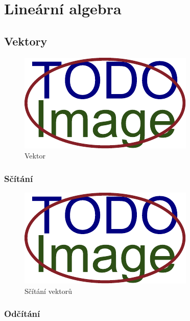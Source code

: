 \section{Lineární algebra}\label{ch:teorie:lineární-algebra}

\subsection{Vektory}\label{ch:teorie:lineární-algebra:vektory}

\begin{figure}[H]
	\centering
	\includegraphics[width=.5\linewidth]{obrazky-figures/placeholder.pdf}
	\caption{Vektor}
	\label{fig:lineární-algebra:vektor}
\end{figure}

\subsubsection*{Sčítání}

\begin{figure}[H]
	\centering
	\includegraphics[width=.5\linewidth]{obrazky-figures/placeholder.pdf}
	\caption{Sčítání vektorů}
	\label{fig:lineární-algebra:sčítání}
\end{figure}

\subsubsection*{Odčítání}

